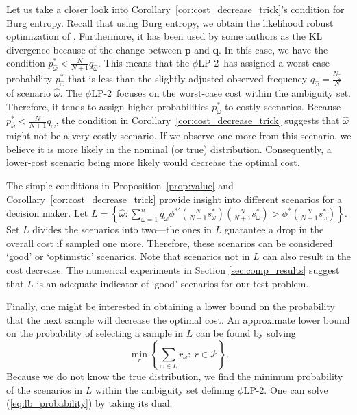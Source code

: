 \documentclass[opre,nonblindrev]{informs3} %
\newcommand{\q}{\mathbf{q}}
\newcommand{\p}{\mathbf{p}}
\newcommand{\plp}{$\phi$LP-2}
\begin{document}
Let us take a closer look into Corollary~\ref{cor:cost_decrease_trick}'s condition for Burg entropy. 
Recall that using Burg entropy, we obtain the likelihood robust optimization of \cite{wang2010likelihood}.
Furthermore, it has been used by some authors as the KL divergence because of the change between $\p$ and $\q$. 
In this case, we have the condition $p_{\hat{\omega}}^* < \frac{N}{N+1}q_{\hat{\omega}}$.  
This means that the \plp\ has assigned a worst-case probability  $p_{\hat{\omega}}^*$ that is less than the slightly adjusted observed frequency $q_{\hat{\omega}}=\frac{N_{\hat{\omega}}}{N}$ of scenario $\hat{\omega}$. 
The \plp\ focuses on the worst-case cost within the ambiguity set. 
Therefore, it tends to assign higher probabilities $p_\omega^*$ to costly 
scenarios. 
Because $p_{\hat{\omega}}^* < \frac{N}{N+1}q_{\hat{\omega}}$, the condition in Corollary~\ref{cor:cost_decrease_trick} suggests that $\hat{\omega}$ might not be a very costly scenario. 
If we observe one more from this scenario, we believe it is more likely in the nominal (or true) distribution. 
Consequently, a lower-cost scenario being more likely would decrease the optimal cost. 


The simple conditions in Proposition~\ref{prop:value} and Corollary~\ref{cor:cost_decrease_trick} provide insight into different scenarios for a decision maker. 
Let $L = \left\{ \hat{\omega} : \sum_{\omega=1}^n q_\omega \phi^{*\prime}\left(\frac{N}{N+1}s^*_\omega\right) \left(\frac{N}{N+1}s^*_\omega\right) > \phi^*\left(\frac{N}{N+1}s^*_{\hat{\omega}}\right) \right\}$.
Set $L$ divides the scenarios into two---the ones in $L$ guarantee a drop in the overall cost if sampled one more.
Therefore, these scenarios can be considered `good' or `optimistic' scenarios. 
Note that scenarios not in $L$ can also result in the cost decrease. 
The numerical experiments in Section \ref{sec:comp_results} suggest that $L$ is an adequate indicator of `good' scenarios for our test problem. 
 



Finally, one might be interested in obtaining a lower bound on the probability that the next sample will decrease the optimal cost. 
An approximate lower bound on the probability of selecting a sample in $L$ can be found by solving
\begin{equation}
	\min_{r} \left\{ \sum_{\omega \in L} r_\omega \colon\ r \in \mathcal{P} \right\}. \label{eq:lb_probability}
\end{equation}
Because we do not know the true distribution, we find the minimum probability of the scenarios in $L$ within the ambiguity set defining \plp.
One can solve (\ref{eq:lb_probability}) by taking its dual.
\end{document}
